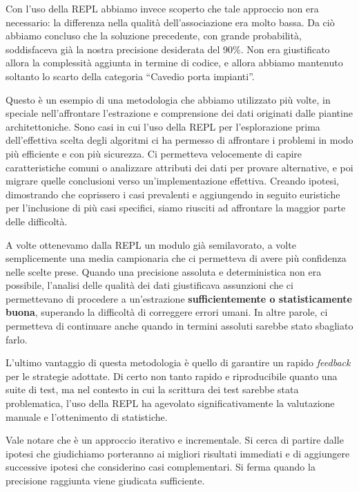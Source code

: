 \documentclass[12pt]{report}
\begin{document}
Con l'uso della REPL abbiamo invece scoperto che tale approccio non era
necessario: la differenza nella qualità dell'associazione era molto
bassa. Da ciò abbiamo concluso che la soluzione precedente, con grande
probabilità, soddisfaceva già la nostra precisione desiderata del 90\%.
Non era giustificato allora la complessità aggiunta in termine di 
codice, e allora abbiamo mantenuto soltanto lo scarto della 
categoria ``Cavedio porta impianti''.

Questo è un esempio di una metodologia che abbiamo utilizzato più volte, in
speciale nell'affrontare l'estrazione e comprensione dei dati originati
dalle piantine architettoniche.
Sono casi in cui l'uso della REPL per l'esplorazione prima
dell'effettiva scelta degli algoritmi ci ha permesso
di affrontare i problemi in modo più efficiente e con più
sicurezza. Ci permetteva velocemente di capire caratteristiche comuni
o analizzare attributi dei dati per provare alternative, e poi migrare
quelle conclusioni verso un'implementazione effettiva. Creando
ipotesi, dimostrando che coprissero i casi prevalenti e aggiungendo in
seguito euristiche per l'inclusione di più casi specifici, siamo riusciti ad
affrontare la maggior parte delle difficoltà.

A volte ottenevamo dalla REPL un modulo già semilavorato, a volte
semplicemente una media campionaria che ci permetteva di avere più
confidenza nelle scelte prese.
Quando una precisione assoluta e deterministica non era possibile,
l'analisi delle qualità dei dati giustificava assunzioni che ci
permettevano di procedere a un'estrazione \textbf{sufficientemente o
statisticamente buona}, superando la difficoltà di correggere errori
umani. In altre parole, ci permetteva di continuare anche quando in
termini assoluti sarebbe stato sbagliato farlo.

L'ultimo vantaggio di questa metodologia è quello di garantire un
rapido \textit{feedback} per le strategie adottate. Di certo non tanto
rapido e riproducibile quanto una suite di test, 
ma nel contesto in cui la scrittura
dei test sarebbe stata problematica, l'uso della REPL ha agevolato
significativamente la valutazione manuale e l'ottenimento di statistiche.

Vale notare che è un approccio iterativo e incrementale. Si cerca di partire
dalle ipotesi che giudichiamo porteranno ai migliori risultati immediati
e di aggiungere successive ipotesi che considerino casi complementari. Si 
ferma quando la precisione raggiunta viene giudicata sufficiente.
\end{document}
